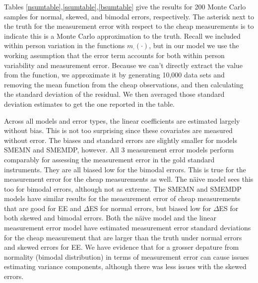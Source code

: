 \documentclass[11pt]{article}\usepackage[]{graphicx}\usepackage[]{color}
\begin{document}
Tables \ref{nsumtable},\ref{ssumtable},\ref{bsumtable} give the results for 200 Monte Carlo samples for normal, skewed, and bimodal errors, respectively. The asterisk next to the truth for the measurement error with respect to the cheap measurements is to indicate this is a Monte Carlo approximation to the truth. Recall we included within person variation in the functions $m_{\cdot}(\cdot)$, but in our model we use the working assumption that the error term accounts for both within person variability and measurement error. Because we can't directly extract the value from the function, we approximate it by generating 10,000 data sets and removing the mean function from the cheap observations, and then calculating the standard deviation of the residual. We then averaged those standard deviation estimates to get the one reported in the table.

Across all models and error types, the linear coefficients are estimated largely without bias. This is not too surprising since these covariates are measured without error. The biases and standard errors are slightly smaller for models SMEMN and SMEMDP, however. All 3 measurement error models perform comparably for assessing the measurement error in the gold standard instruments. They are all biased low for the bimodal errors. This is true for the measurement error for the cheap measurements as well. The n{\"a}ive model sees this too for bimodal errors, although not as extreme. The SMEMN and SMEMDP models have similar results for the measurement error of cheap measurements that are good for EE and $\Delta$ES for normal errors, but biased low for $\Delta$ES for both skewed and bimodal errors. Both the n{\"a}ive model and the linear measurement error model have estimated measurement error standard deviations for the cheap measurement that are larger than the truth under normal errors and skewed errors for EE. We have evidence that for a grosser depature from normality (bimodal distribution) in terms of measurement error can cause issues estimating variance components, although there was less issues with the skewed errors.
\end{document}

